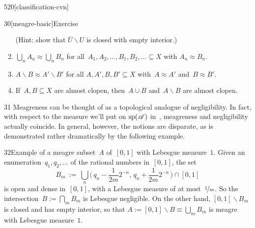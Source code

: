 \begin{parsec}{520}[classification-cvn]
\begin{point}{30}[meagre-basic]{Exercise}
\begin{enumerate}
(Hint: show that $\overline{U}\backslash U$
is closed with empty interior.)
\item
$\bigcup_n A_n\approx \bigcup_n B_n$
for all~$A_1,A_2,\dotsc, B_1,B_2,\dotsc\subseteq X$
with $A_n\approx B_n$.
\item
$A\backslash B \approx A'\backslash B'$
for all $A,A',B,B'\subseteq X$
with~$A\approx A'$ and~$B\approx B'$.
\item
If~$A,B\subseteq X$ are almost clopen,
then~$A\cup B$ and~$A\backslash B$ 
are almost clopen.
\end{enumerate}
\spacingfix
\end{point}%
\begin{point}{31}%
Meagreness can be thought of as a topological analogue of negligibility.
In fact, with respect to the measure we'll put on $\mathrm{sp}(\mathscr{A})$
in~,
    meagreness and negligibility actually coincide.
In general, however, 
the notions are disparate,
as is demonstrated rather dramatically by the following example.
\end{point}
\begin{point}{32}{Example}
of a meagre subset~$A$ of~$[0,1]$
with Lebesgue measure~$1$.
Given an enumeration~$q_1,q_2,\dotsc$
    of the rational numbers in~$[0,1]$,
the set
\begin{equation*}
    \textstyle
    B_m \ :=\  \bigcup_n 
    \bigl(\,q_n-\frac{1}{2m}2^{-n},\,q_n+\frac{1}{2m}2^{-n}\,\bigr)
    \cap[0,1]
\end{equation*}
is open and dense in~$[0,1]$, with a Lebesgue measure 
of at most~$\nicefrac{1}{m}$.
So the intersection~$B:=\bigcap_m B_m$ is Lebesgue negligible.
On the other hand, $[0,1]\backslash B_m$
is closed and has empty interior,
so that $A:=[0,1]\backslash B\equiv \bigcup_m B_m$
is meagre with Lebesgue measure~$1$.
\end{point}
\end{parsec}
